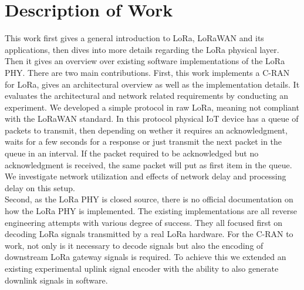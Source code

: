 \section{Description of Work}
This work first gives a general introduction to LoRa, LoRaWAN and its applications, then dives 
into more details regarding the LoRa physical layer. Then it gives an overview over existing 
software implementations of the LoRa PHY. There are two main contributions. First, this work 
implements a C-RAN for LoRa, gives an architectural overview as well as the implementation details.
It evaluates the architectural and network related requirements by conducting an experiment. We developed a simple protocol in raw LoRa,
meaning not compliant with the LoRaWAN standard. In this protocol physical IoT device has a queue of packets to transmit, then depending on 
wether it requires an acknowledgment, waits for a few seconds for a response or just transmit the next packet in the queue in an interval.
If the packet required to be acknowledged but no acknowledgment is received, the same packet will put as first item in the queue.
We investigate network utilization and effects of network delay and processing delay on this setup.
\\
Second, as the LoRa PHY is closed source, there is no official documentation on how the LoRa PHY is implemented.
The existing implementations are all reverse engineering attempts with various degree of success. 
They all focused first on decoding LoRa signals transmitted by a real LoRa hardware. For the C-RAN to work, not only is it 
necessary to decode signals but also the encoding of downstream LoRa gateway signals is required. To achieve this we extended 
an existing experimental uplink signal encoder with the ability to also generate downlink signals in software.


